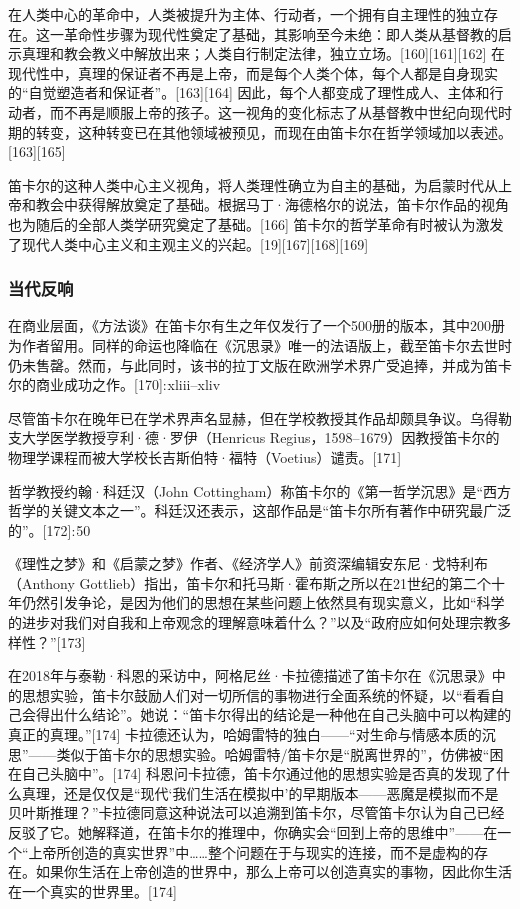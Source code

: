 在人类中心的革命中，人类被提升为主体、行动者，一个拥有自主理性的独立存在。这一革命性步骤为现代性奠定了基础，其影响至今未绝：即人类从基督教的启示真理和教会教义中解放出来；人类自行制定法律，独立立场。[160][161][162] 在现代性中，真理的保证者不再是上帝，而是每个人类个体，每个人都是自身现实的“自觉塑造者和保证者”。[163][164] 因此，每个人都变成了理性成人、主体和行动者，而不再是顺服上帝的孩子。这一视角的变化标志了从基督教中世纪向现代时期的转变，这种转变已在其他领域被预见，而现在由笛卡尔在哲学领域加以表述。[163][165]

笛卡尔的这种人类中心主义视角，将人类理性确立为自主的基础，为启蒙时代从上帝和教会中获得解放奠定了基础。根据马丁·海德格尔的说法，笛卡尔作品的视角也为随后的全部人类学研究奠定了基础。[166] 笛卡尔的哲学革命有时被认为激发了现代人类中心主义和主观主义的兴起。[19][167][168][169]
\subsubsection{当代反响}
在商业层面，《方法谈》在笛卡尔有生之年仅发行了一个500册的版本，其中200册为作者留用。同样的命运也降临在《沉思录》唯一的法语版上，截至笛卡尔去世时仍未售罄。然而，与此同时，该书的拉丁文版在欧洲学术界广受追捧，并成为笛卡尔的商业成功之作。[170]: xliii–xliv

尽管笛卡尔在晚年已在学术界声名显赫，但在学校教授其作品却颇具争议。乌得勒支大学医学教授亨利·德·罗伊（Henricus Regius，1598–1679）因教授笛卡尔的物理学课程而被大学校长吉斯伯特·福特（Voetius）谴责。[171]

哲学教授约翰·科廷汉（John Cottingham）称笛卡尔的《第一哲学沉思》是“西方哲学的关键文本之一”。科廷汉还表示，这部作品是“笛卡尔所有著作中研究最广泛的”。[172]: 50

《理性之梦》和《启蒙之梦》作者、《经济学人》前资深编辑安东尼·戈特利布（Anthony Gottlieb）指出，笛卡尔和托马斯·霍布斯之所以在21世纪的第二个十年仍然引发争论，是因为他们的思想在某些问题上依然具有现实意义，比如“科学的进步对我们对自我和上帝观念的理解意味着什么？”以及“政府应如何处理宗教多样性？”[173]

在2018年与泰勒·科恩的采访中，阿格尼丝·卡拉德描述了笛卡尔在《沉思录》中的思想实验，笛卡尔鼓励人们对一切所信的事物进行全面系统的怀疑，以“看看自己会得出什么结论”。她说：“笛卡尔得出的结论是一种他在自己头脑中可以构建的真正的真理。”[174] 卡拉德还认为，哈姆雷特的独白——“对生命与情感本质的沉思”——类似于笛卡尔的思想实验。哈姆雷特/笛卡尔是“脱离世界的”，仿佛被“困在自己头脑中”。[174] 科恩问卡拉德，笛卡尔通过他的思想实验是否真的发现了什么真理，还是仅仅是“现代‘我们生活在模拟中’的早期版本——恶魔是模拟而不是贝叶斯推理？”卡拉德同意这种说法可以追溯到笛卡尔，尽管笛卡尔认为自己已经反驳了它。她解释道，在笛卡尔的推理中，你确实会“回到上帝的思维中”——在一个“上帝所创造的真实世界”中……整个问题在于与现实的连接，而不是虚构的存在。如果你生活在上帝创造的世界中，那么上帝可以创造真实的事物，因此你生活在一个真实的世界里。[174]
